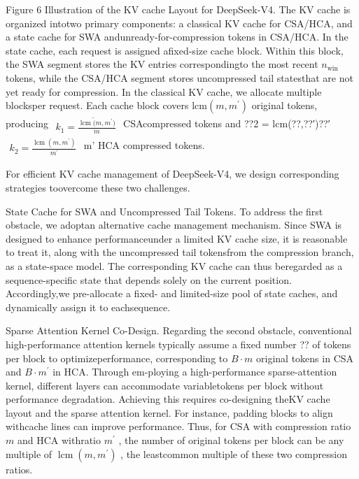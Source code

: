 \documentclass[
  10
]{article}
\begin{document}
Figure 6 \textbar{} Illustration of the KV cache Layout for DeepSeek-V4.
The KV cache is organized intotwo primary components: a classical KV
cache for CSA/HCA, and a state cache for SWA andunready-for-compression
tokens in CSA/HCA. In the state cache, each request is assigned
afixed-size cache block. Within this block, the SWA segment stores the
KV entries correspondingto the most recent \(n _ { \mathrm { w i n } }\)
tokens, while the CSA/HCA segment stores uncompressed tail statesthat
are not yet ready for compression. In the classical KV cache, we
allocate multiple blocksper request. Each cache block covers
\(\mathrm { l c m } ( m , m ^ { \prime } )\) original tokens, producing
\(\begin{array} { r } { k _ { 1 } = \frac { \operatorname { l c m } \tilde { ( } m , m ^ { \prime } ) } { m } } \end{array}\)
CSAcompressed tokens and ??2 = lcm(??,??′)??′
\(\begin{array} { r } { k _ { 2 } = \frac { \operatorname { l c m } ( m , m ^ { \prime } ) } { m ^ { \prime } } } \end{array}\)
m' HCA compressed tokens.

For efficient KV cache management of DeepSeek-V4, we design
corresponding strategies toovercome these two challenges.

State Cache for SWA and Uncompressed Tail Tokens. To address the first
obstacle, we adoptan alternative cache management mechanism. Since SWA
is designed to enhance performanceunder a limited KV cache size, it is
reasonable to treat it, along with the uncompressed tail tokensfrom the
compression branch, as a state-space model. The corresponding KV cache
can thus beregarded as a sequence-specific state that depends solely on
the current position. Accordingly,we pre-allocate a fixed- and
limited-size pool of state caches, and dynamically assign it to
eachsequence.

Sparse Attention Kernel Co-Design. Regarding the second obstacle,
conventional high-performance attention kernels typically assume a fixed
number ?? of tokens per block to optimizeperformance, corresponding to
\(B \cdot m\) original tokens in CSA and \(B \cdot m ^ { \prime }\) in
HCA. Through em-ploying a high-performance sparse-attention kernel,
different layers can accommodate variabletokens per block without
performance degradation. Achieving this requires co-designing theKV
cache layout and the sparse attention kernel. For instance, padding
blocks to align withcache lines can improve performance. Thus, for CSA
with compression ratio \(m\) and HCA withratio \(m ^ { \prime }\) , the
number of original tokens per block can be any multiple of
\(\operatorname { l c m } ( m , m ^ { \prime } )\) , the leastcommon
multiple of these two compression ratios.
\end{document}
